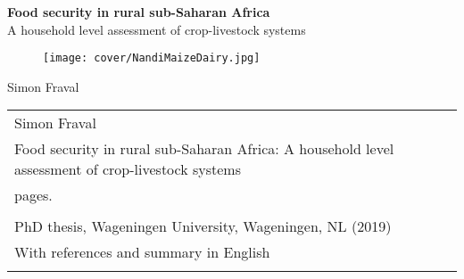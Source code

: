 \thispagestyle{empty}
\begin{center}
\Huge{\textbf{Food security in rural sub-Saharan Africa}} \\
\large{A household level assessment of crop-livestock systems} \\
\vspace*{1cm}
\vspace*{1cm}
\end{center}

\begin{figure}[H] %
  \centering
  \texttt{[image: cover/NandiMaizeDairy.jpg]}
\end{figure}

\begin{center}
\vspace*{\fill}


\large{Simon Fraval}\\
\end{center}

\newpage

\thispagestyle{empty}
\vspace*{\fill}
\begin{flushleft}
\begin{tabular}{l}
    Simon Fraval                                                 \\
    Food security in rural sub-Saharan Africa: A household level assessment of crop-livestock systems                 \\
    \pageref{LastPage} pages.                                    \\
                                                                 \\
    PhD thesis, Wageningen University, Wageningen, NL (2019)     \\
    With references and summary in English                     \\
                                                                 \\

\end{tabular}
\end{flushleft}
